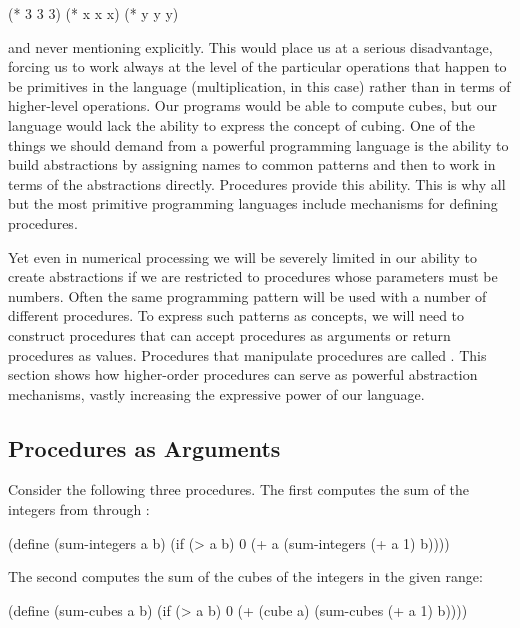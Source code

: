 \begin{codeBlock}
(* 3 3 3)
(* x x x)
(* y y y)
\end{codeBlock}

\noindent
and never mentioning  explicitly.  This would place us at a serious
disadvantage, forcing us to work always at the level of the particular
operations that happen to be primitives in the language (multiplication, in
this case) rather than in terms of higher-level operations.  Our programs would
be able to compute cubes, but our language would lack the ability to express
the concept of cubing.  One of the things we should demand from a powerful
programming language is the ability to build abstractions by assigning names to
common patterns and then to work in terms of the abstractions directly.
Procedures provide this ability.  This is why all but the most primitive
programming languages include mechanisms for defining procedures.

Yet even in numerical processing we will be severely limited in our ability to
create abstractions if we are restricted to procedures whose parameters must be
numbers.  Often the same programming pattern will be used with a number of
different procedures.  To express such patterns as concepts, we will need to
construct procedures that can accept procedures as arguments or return
procedures as values.  Procedures that manipulate procedures are called
.  This section shows how higher-order
procedures can serve as powerful abstraction mechanisms, vastly increasing the
expressive power of our language.



\subsection{Procedures as Arguments}
\label{Section 1.3.1}

Consider the following three procedures.  The first computes the sum of the
integers from  through :

\begin{codeBlock}
(define (sum-integers a b)
  (if (> a b)
      0
      (+ a (sum-integers (+ a 1) b))))
\end{codeBlock}

\noindent
The second computes the sum of the cubes of the integers in the given range:

\begin{codeBlock}
(define (sum-cubes a b)
  (if (> a b)
      0
      (+ (cube a)
         (sum-cubes (+ a 1) b))))
\end{codeBlock}

